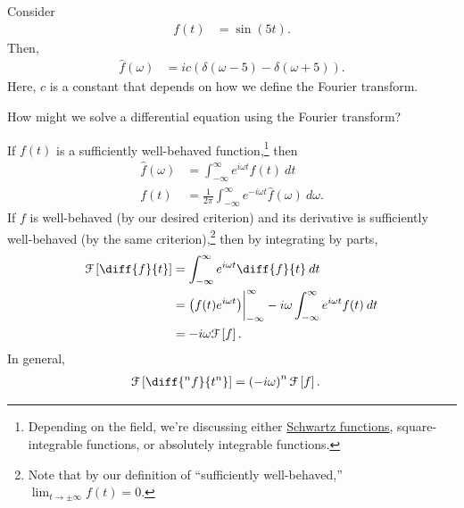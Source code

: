 \documentclass[10pt]{mypackage}
\begin{document}
\begin{example}
  Consider
  \begin{align*}
    f(t) &= \sin\left( 5t \right).
  \end{align*}
  Then,
  \begin{align*}
    \hat{f}\left( \omega \right) &= ic\left( \delta\left(\omega - 5\right) - \delta\left( \omega + 5 \right) \right).
  \end{align*}
  Here, $c$ is a constant that depends on how we define the Fourier transform.
\end{example}
\begin{example}
  How might we solve a differential equation using the Fourier transform?\newline

  If $f(t)$ is a sufficiently well-behaved function,\footnote{Depending on the field, we're discussing either \href{https://en.wikipedia.org/wiki/Schwartz_space}{Schwartz functions}, square-integrable functions, or absolutely integrable functions.} then
  \begin{align*}
    \hat{f}\left( \omega \right) &= \int_{-\infty}^{\infty} e^{i\omega t}f(t)\:dt\\
    f(t) &= \frac{1}{2\pi}\int_{-\infty}^{\infty} e^{-i\omega t}\hat{f}(\omega)\:d\omega.
  \end{align*}
  If $f$ is well-behaved (by our desired criterion) and its derivative is sufficiently well-behaved (by the same criterion),\footnote{Note that by our definition of ``sufficiently well-behaved,'' $\lim_{t\rightarrow\pm\infty}f(t) = 0$.} then by integrating by parts,
  \begin{align*}
    \mathcal{F}\left[ \diff{f}{t} \right] &= \int_{-\infty}^{\infty} e^{i\omega t}\diff{f}{t}\:dt\\
                                          &= \left( f(t)e^{i\omega t} \right)\biggr\vert_{-\infty}^{\infty} -i\omega \int_{-\infty}^{\infty} e^{i\omega t}f(t)\:dt\\
                                          &= -i\omega \mathcal{F}\left[ f \right].
  \end{align*}
  In general,
  \begin{align*}
    \mathcal{F}\left[ \diff{^nf}{t^n} \right] &= \left( -i\omega \right)^{n} \mathcal{F}\left[ f \right].
  \end{align*}
\end{example}
\end{document}
